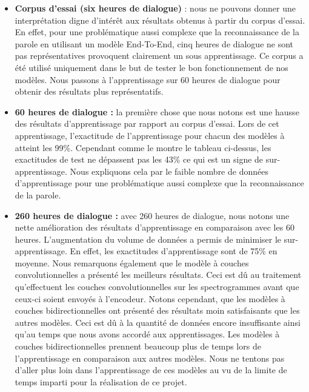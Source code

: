 \begin{itemize}
    \item \textbf{Corpus d'essai (six heures de dialogue)} : nous ne pouvons donner une interprétation digne d'intérêt aux résultats obtenus à partir du corpus d'essai. En effet, pour une problématique aussi complexe que la reconnaissance de la parole en utilisant un modèle End-To-End, cinq heures de dialogue ne sont pas représentatives provoquent clairement un sous apprentissage. Ce corpus a été utilisé uniquement dans le but de tester le bon fonctionnement de nos modèles. Nous passons à l'apprentissage sur 60 heures de dialogue pour obtenir des résultats plus représentatifs. \\
    
    \item \textbf{60 heures de dialogue :} la première chose que nous notons est une hausse des résultats d'apprentissage par rapport au corpus d'essai. Lors de cet apprentissage, l'exactitude de l'apprentissage pour chacun des modèles à atteint les 99\%. Cependant comme le montre le tableau ci-dessus, les exactitudes de test ne dépassent pas les 43\% ce qui est un signe de sur-apprentissage. Nous expliquons cela par le faible nombre de données d'apprentissage pour une problématique aussi complexe que la reconnaissance de la parole. \\
    
    \item \textbf{260 heures de dialogue :} avec 260 heures de dialogue, nous notons une nette amélioration des résultats d'apprentissage en comparaison avec les 60 heures. L'augmentation du volume de données a permis de minimiser le sur-apprentissage. En effet, les exactitudes d'apprentissage sont de 75\% en moyenne. Nous remarquons également que le modèle à couches convolutionnelles a présenté les meilleurs résultats. Ceci est dû au traitement qu'effectuent les couches convolutionnelles sur les spectrogrammes avant que ceux-ci soient envoyés à l'encodeur. Notons cependant, que les modèles à couches bidirectionnelles ont présenté des résultats moin satisfaisants que les autres modèles. Ceci est dû à la quantité de données encore insuffisante ainsi qu'au temps que nous avons accordé aux apprentissages. Les modèles à couches bidirectionnelles prennent beaucoup plus de temps lors de l'apprentissage en comparaison aux autres modèles. Nous ne tentons pas d'aller plus loin dans l'apprentissage de ces modèles au vu de la limite de temps imparti pour la réalisation de ce projet. 
\end{itemize}

